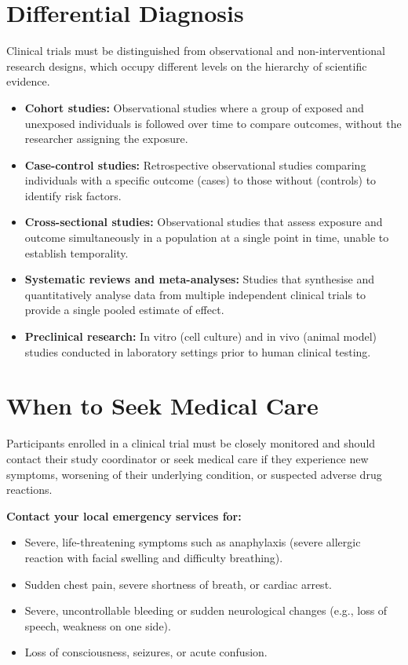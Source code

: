 \section*{Differential Diagnosis}
Clinical trials must be distinguished from observational and non-interventional research designs, which occupy different levels on the hierarchy of scientific evidence.
\begin{itemize}
    \item \textbf{Cohort studies:} Observational studies where a group of exposed and unexposed individuals is followed over time to compare outcomes, without the researcher assigning the exposure.
    \item \textbf{Case-control studies:} Retrospective observational studies comparing individuals with a specific outcome (cases) to those without (controls) to identify risk factors.
    \item \textbf{Cross-sectional studies:} Observational studies that assess exposure and outcome simultaneously in a population at a single point in time, unable to establish temporality.
    \item \textbf{Systematic reviews and meta-analyses:} Studies that synthesise and quantitatively analyse data from multiple independent clinical trials to provide a single pooled estimate of effect.
    \item \textbf{Preclinical research:} In vitro (cell culture) and in vivo (animal model) studies conducted in laboratory settings prior to human clinical testing.
\end{itemize}

\section*{When to Seek Medical Care}
Participants enrolled in a clinical trial must be closely monitored and should contact their study coordinator or seek medical care if they experience new symptoms, worsening of their underlying condition, or suspected adverse drug reactions.

\textbf{Contact your local emergency services for:}
\begin{itemize}
    \item Severe, life-threatening symptoms such as anaphylaxis (severe allergic reaction with facial swelling and difficulty breathing).
    \item Sudden chest pain, severe shortness of breath, or cardiac arrest.
    \item Severe, uncontrollable bleeding or sudden neurological changes (e.g., loss of speech, weakness on one side).
    \item Loss of consciousness, seizures, or acute confusion.
\end{itemize}

